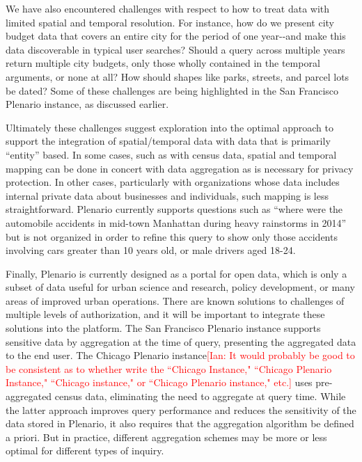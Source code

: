 \documentclass[11pt]{article}
\newcommand{\ian}[1]{\textcolor{Red}{[Ian: #1]}}
\newcommand{\ian}[1]{}
\begin{document}
We have also encountered challenges with respect to how to treat data with limited spatial and temporal resolution. For instance, how do we present city budget data that covers an entire city for the period of one year-{}-and make this data discoverable in typical user searches? Should a query across multiple years return multiple city budgets, only those wholly contained in the temporal arguments, or none at all? How should shapes like parks, streets, and parcel lots be dated? Some of these challenges are being highlighted in the San Francisco Plenario instance, as discussed earlier.

Ultimately these challenges suggest exploration into the optimal approach to support the integration of spatial/temporal data with data that is primarily ``entity'' based. In some cases, such as with census data, spatial and temporal mapping can be done in concert with data aggregation as is necessary for privacy protection. In other cases, particularly with organizations whose data includes internal private data about businesses and individuals, such mapping is less straightforward. Plenario currently supports questions such as ``where were the automobile accidents in mid-town Manhattan during heavy rainstorms in 2014'' but is not organized in order to refine this query to show only those accidents involving cars greater than 10 years old, or male drivers aged 18-24.

Finally, Plenario is currently designed as a portal for open data, which is only a subset of data useful for urban science and research, policy development, or many areas of improved urban operations. There are known solutions to challenges of multiple levels of authorization, and it will be important to integrate these solutions into the platform. The San Francisco Plenario instance supports sensitive data by aggregation at the time of query, presenting the aggregated data to the end user. The Chicago Plenario instance\ian{It would probably be good to be consistent as to whether write the ``Chicago Instance," ``Chicago Plenario Instance," ``Chicago instance," or ``Chicago Plenario instance," etc.} uses pre-aggregated census data, eliminating the need to aggregate at query time. While the latter approach improves query performance and reduces the sensitivity of the data stored in Plenario, it also requires that the aggregation algorithm be defined a priori. But in practice, different aggregation schemes may be more or less optimal for different types of inquiry.
\end{document}
